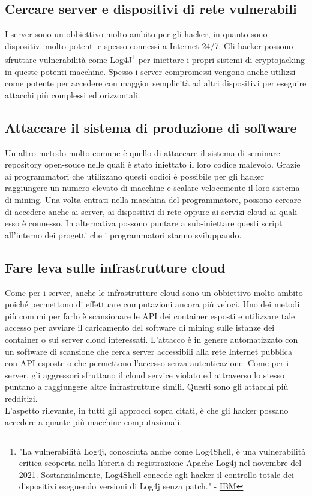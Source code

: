 \documentclass[12pt,a4paper]{article}
\begin{document}
\subsection{Cercare server e dispositivi di rete vulnerabili}
I server sono un obbiettivo molto ambito per gli hacker, in quanto sono
dispositivi molto potenti e spesso connessi a Internet 24/7. Gli hacker possono
sfruttare vulnerabilità come Log4J\footnote{"La vulnerabilità Log4j, conosciuta
anche come Log4Shell, è una vulnerabilità critica scoperta nella libreria di
registrazione Apache Log4j nel novembre del 2021. Sostanzialmente, Log4Shell
concede agli hacker il controllo totale dei dispositivi eseguendo versioni di
Log4j senza patch." - \href{https://arc.net/l/quote/zjujxamu}{IBM}} per
iniettare i propri sistemi di cryptojacking in queste potenti macchine. Spesso i
server compromessi vengono anche utilizzi come potente per accedere con maggior
semplicità ad altri dispositivi per eseguire attacchi più complessi ed
orizzontali.

\subsection{Attaccare il sistema di produzione di software}
Un altro metodo molto comune è quello di attaccare il sistema di seminare
repository open-souce nelle quali è stato iniettato il loro codice malevolo.
Grazie ai programmatori che utilizzano questi codici è possibile per gli hacker
raggiungere un numero elevato di macchine e scalare velocemente il loro sistema
di mining. Una volta entrati nella macchina del programmatore, possono cercare
di accedere anche ai server, ai dispositivi di rete oppure ai servizi cloud ai
quali esso è connesso. In alternativa possono puntare a sub-iniettare questi
script all'interno dei progetti che i programmatori stanno sviluppando.

\subsection{Fare leva sulle infrastrutture cloud}
Come per i server, anche le infrastrutture cloud sono un obbiettivo molto ambito
poiché permettono di effettuare computazioni ancora più veloci. Uno dei metodi
più comuni per farlo è scansionare le API dei container esposti e utilizzare
tale accesso per avviare il caricamento del software di mining sulle istanze dei
container o sui server cloud interessati. L'attacco è in genere automatizzato
con un software di scansione che cerca server accessibili alla rete Internet
pubblica con API esposte o che permettono l'accesso senza autenticazione. Come
per i server, gli aggressori sfruttano il cloud service violato ed attraverso lo
stesso puntano a raggiungere altre infrastrutture simili. Questi sono gli
attacchi più redditizi. \\
L'aspetto rilevante, in tutti gli approcci sopra citati, è che gli hacker
possano accedere a quante più macchine computazionali.
\end{document}
